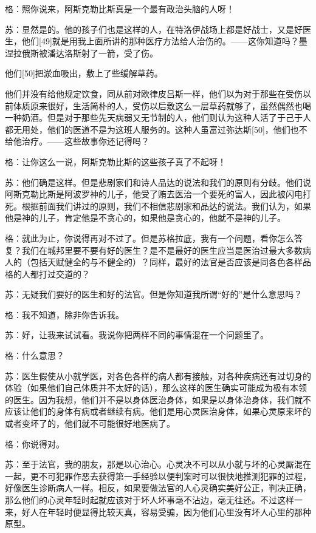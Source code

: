 \documentclass[12pt,oneside]{book}
\begin{document}
格：照你说来，阿斯克勒比斯真是一个最有政治头脑的人呀！

苏：显然是的。他的孩子们也是这样的人，在特洛伊战场上都是好战士，又是好医生，他们[49]就是用我上面所讲的那种医疗方法给人治伤的。——这你知道吗？墨涅拉俄斯被潘达洛斯射了一箭，受了伤。

他们[50]把淤血吸出，敷上了些缓解草药。

他们并没有给他规定饮食，同从前对欧律皮吕斯一样，他们以为对于那些在受伤以前体质原来很好，生活简朴的人，受伤以后敷这么一层草药就够了，虽然偶然也喝一种奶酒。但是对于那些先天病弱又无节制的人，他们则认为这种人活了于己于人都无用处，他们的医道不是为这班人服务的。这种人虽富过弥达斯[50]，他们也不给他治疗。——这些故事你还记得吗？

格：让你这么一说，阿斯克勒比斯的这些孩子真了不起呀！

苏：他们确是这样。但是悲剧家们和诗人品达的说法和我们的原则有分歧。他们说阿斯克勒比斯是阿波罗神的儿子，他受了贿去医治一个要死的富人，因此被闪电打死。根据前面我们讲过的原则，我们不相信悲剧家和品达的说法。我们认为，如果他是神的儿子，肯定他是不贪心的，如果他是贪心的，他就不是神的儿子。

格：就此为止，你说得再对不过了。但是苏格拉底，我有一个问题，看你怎么答复？我们在城邦里要不要有好的医生？是不是最好的医生应当是医治过最大多数病人的（包括天赋健全的与不健全的）？同样，最好的法官是否应该是同各色各样品格的人都打过交道的？

苏：无疑我们要好的医生和好的法官。但是你知道我所谓“好的”是什么意思吗？

格：我不知道，除非你告诉我。

苏：好，让我来试试看。我说你把两样不同的事情混在一个问题里了。

格：什么意思？

苏：医生假使从小就学医，对各色各样的病人都有接触，对各种疾病还有过切身的体验（如果他们自己体质并不太好的话），那么这样的医生确实可能成为极有本领的医生。因为我想，他们并不是以身体医治身体，如果是以身体治身体，我们就不应该让他们的身体有病或者继续有病。他们是用心灵医治身体，如果心灵原来坏的或者变坏了的，他们就不可能很好地医病了。

格：你说得对。

苏：至于法官，我的朋友，那是以心治心。心灵决不可以从小就与坏的心灵厮混在一起，更不可犯罪作恶去获得第一手经验以便判案时可以很快地推测犯罪的过程，好像医生诊断病人一样。相反，如果要做法官的人心灵确实美好公正，判决正确，那么他们的心灵年轻时起就应该对于坏人坏事毫不沾边，毫无往还。不过这样一来，好人在年轻时便显得比较天真，容易受骗，因为他们心里没有坏人心里的那种原型。
\end{document}
